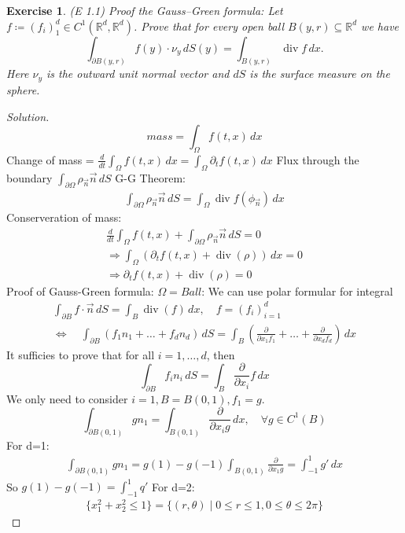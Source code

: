 \documentclass{report}
\theoremstyle{tommy}
\newtheorem{ex}[defn]{Exercise}
\renewcommand\div{\operatorname{div}}
\begin{document}
\begin{ex} (E 1.1)
  Proof the Gauss–Green formula: Let \(f \coloneqq (f_i)_1^d \in C^1(\mathbb{R}^d, \mathbb{R}^d)\). Prove that for every open ball \(B(y, r) \subseteq \mathbb{R}^d\) we have \[\int_{\partial B(y, r)} f(y) \cdot \nu_y \, dS(y) = \int_{B(y, r)}\div f \, dx.\]
  Here \(\nu_y\) is the outward unit normal vector and \(dS\) is the surface measure on the sphere.
\end{ex}

\begin{proof}[Solution]
  \[mass = \int_\Omega f(t, x) \, dx\]
  Change of mass = \(\frac{d}{dt} \int_\Omega f(t, x) \, dx = \int_\Omega \partial_t f(t,x) \, dx\)
  Flux through the boundary \(\int_{\partial \Omega} \rho_{\vec n} \vec{n} \, dS\)
  G-G Theorem: 
  \begin{align*}
    \int_{\partial \Omega} \rho_{\vec{n}} \vec{n} \, dS = \int_{\Omega} \div f(\phi_{\vec{n}}) \, dx
  \end{align*}
  Conserveration of mass:
  \begin{align*}
    \frac{d}{dt} \int_\Omega f(t, x) + \int_{\partial \Omega} \rho_{\vec{n}} \vec{n} \, dS = 0 \\
    \Rightarrow \int_\Omega (\partial_t f(t, x) + \div(\rho)) \, dx = 0 \\
    \Rightarrow \partial_t f(t,x) + \div(\rho) = 0
  \end{align*}
  Proof of Gauss-Green formula: \(\Omega = Ball\): We can use polar formular for integral
  \begin{align*}
    \int_{\partial B} f \cdot \vec{n} \, dS = \int_B \div(f) \, dx, \quad f = (f_i)_{i=1}^d \\
    \Leftrightarrow \quad \int_{\partial B} (f_1 n_1 + \dots + f_d n_d) \, dS = \int_B \left(\frac{\partial}{\partial x_1 f_1} + \dots + \frac{\partial}{\partial x_d f_d}\right) \, dx
  \end{align*}
  It sufficies to prove that for all \(i = 1, \dots, d\), then
  \[\int_{\partial B} f_i n_i \, dS = \int_B \frac{\partial}{\partial x_i} f\, dx\]
  We only need to consider \(i=1, B = B(0,1), f_1 = g\).
  \[\int_{\partial B(0,1)} g n_1 = \int_{B(0,1)} \frac{\partial}{\partial x_i g} \, dx, \quad \forall g \in C^1(B)\]
  For d=1:
  \begin{align*}
    \int_{\partial B(0,1)} g n_1 = g(1) - g(-1)
    \int_{B(0,1)} \frac{\partial}{\partial x_1 g} = \int_{-1}^1 g' \, dx
  \end{align*}
  So \(g(1) - g(-1) = \int_{-1}^1 q'\)
  For d=2: 
  \begin{align*}
    \{x_1^2 + x_2^2 \le 1\} = \{(r, \theta) \mid 0 \le r \le 1, 0 \le \theta \le 2 \pi\}
  \end{align*}



\end{proof}
\end{document}
